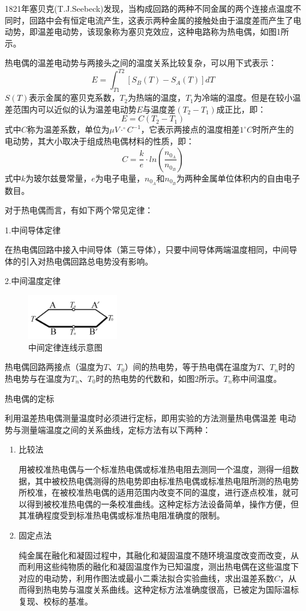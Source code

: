 \documentclass[11pt]{article}
\begin{document}
1821年塞贝克(T.\;J.\;Seebeck)发现，当构成回路的两种不同金属的两个连接点温度不同时，回路中会有恒定电流产生，这表示两种金属的接触处由于温度差而产生了电动势，即温差电动势，该现象称为塞贝克效应，这种电路称为热电偶，如图1所示。

热电偶的温差电动势与两接头之间的温度关系比较复杂，可以用下式表示：
$$
E=\int_{T1}^{T2}[S_B(T)-S_A(T)]dT
$$
$S(T)$表示金属的塞贝克系数，$T_2$为热端的温度，$T_1$为冷端的温度。但是在较小温差范围内可以近似的认为温差电动势$E$与温度差$(T_2-T_1)$成正比，即：
$$
E=C(T_2-T_1)
$$
式中$C$称为温差系数，单位为$\mu V\cdot^{\circ}C^{-1}$，它表示两接点的温度相差$1^{\circ} C$时所产生的电动势，其大小取决于组成热电偶材料的性质，即：
$$
C=\dfrac{k}{e}\cdot ln\left(\dfrac{n_{0_A}}{n_{0_B}}\right)
$$
式中$k$为玻尔兹曼常量，$e$为电子电量，$n_{0_A}$和$n_{0_B}$为两种金属单位体积内的自由电子数目。

对于热电偶而言，有如下两个常见定律：

1.\;中间导体定律
   
在热电偶回路中接入中间导体（第三导体），只要中间导体两端温度相同，中间导体的引入对热电偶回路总电势没有影响。

2.\;中间温度定律

\begin{figure}
    \centering
    \includegraphics[width=4cm]{Figs/中间定律连线示意图.png}
    \caption{中间定律连线示意图}
\end{figure}

热电偶回路两接点（温度为$T$、$T_0$）间的热电势，等于热电偶在温度为$T$、$T_n$时的热电势与在温度为$T_n$、$T_0$时的热电势的代数和，如图2所示。$T_n$称中间温度。

\large 热电偶的定标

\normalsize
利用温差热电偶测量温度时必须进行定标，即用实验的方法测量热电偶温差
电动势与测量端温度之间的关系曲线，定标方法有以下两种：
\begin{enumerate}
    \item 比较法
    
    用被校准热电偶与一个标准热电偶或标准热电阻去测同一个温度，测得一组数据，其中被校热电偶测得的热电势即由标准热电偶或标准热电阻所测的热电势所校准，在被校准热电偶的适用范围内改变不同的温度，进行逐点校准，就可以得到被校准热电偶的一条校准曲线。这种定标方法设备简单，操作方便，但其准确程度受到标准热电偶或标准热电阻准确度的限制。
    \item 固定点法
    
    纯金属在融化和凝固过程中，其融化和凝固温度不随环境温度改变而改变，从而利用这些纯物质的融化和凝固温度作为已知温度，测出热电偶在这些温度下对应的电动势，利用作图法或最小二乘法拟合实验曲线，求出温差系数$C$，从而得到热电势与温度关系曲线。这种定标方法准确度很高，已被定为国际温标复现、校标的基准。
\end{enumerate}
\end{document}
